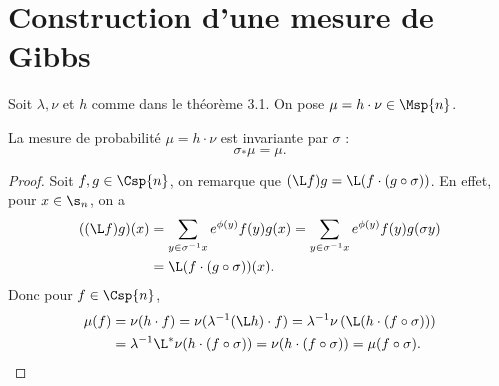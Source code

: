 
%








\section{Construction d'une mesure de Gibbs}

  Soit $\lambda, \nu$ et $h$ comme dans le théorème 3.1.
  On pose $\mu = h \cdot \nu \in \Msp{n}$.

  \begin{lemma}
    \label{lem:hNu_sig_inv}
    \leanok
    La mesure de probabilité $\mu = h \cdot \nu$ est invariante par $\sigma$ :
    $$\sigma_*\mu = \mu.$$
  \end{lemma}

  \begin{proof}
    Soit $f, g \in \Csp{n}$, on remarque que $(\L f)g = \L (f\cdot(g\circ\sigma))$.
    En effet, pour $x \in \s_n$, on a
    \begin{align*}
      ((\L f) g)(x) &= \sum_{y\in\sigma^{-1}x}{e^{\phi(y)}f(y)g(x)} = \sum_{y\in\sigma^{-1}x}{e^{\phi(y)}f(y)g(\sigma y)} \\
		    &= \L(f\cdot(g\circ\sigma))(x).
    \end{align*}
    Donc pour $f \in \Csp{n}$,
    \begin{align*}
      \mu(f) &= \nu(h\cdot f) = \nu(\lambda^{-1}(\L h)\cdot f) = \lambda^{-1}\nu\left(\L(h\cdot(f\circ\sigma))\right) \\
	     &= \lambda^{-1}\L^*\nu(h\cdot(f\circ\sigma)) = \nu(h\cdot(f\circ\sigma)) = \mu(f\circ\sigma).
    \end{align*}
  \end{proof}

